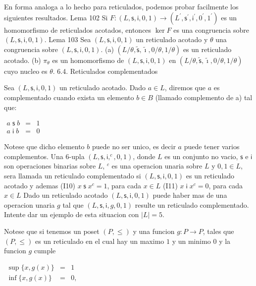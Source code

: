 En forma analoga a lo hecho para reticulados, podemos probar facilmente los siguientes resultados.
Lema 102 Si \(F:(L,\mathsf{s},\mathsf{i},0,1)\rightarrow (L^{\prime },\mathsf{s} ^{\prime },\mathsf{i}^{\prime },0^{\prime },1^{\prime })\) es un homomorfismo de reticulados acotados, entonces \(\ker F\) es una congruencia sobre \((L, \mathsf{s},\mathsf{i},0,1)\).
Lema 103 Sea \((L,\mathsf{s},\mathsf{i},0,1)\) un reticulado acotado y \(\theta \) una congruencia sobre \((L,\mathsf{s},\mathsf{i},0,1)\).
(a) \((L/\theta ,\mathsf{\tilde{s}},\mathsf{\tilde{\imath}},0/\theta ,1/\theta )\) es un reticulado acotado.
(b) \(\pi _{\theta }\) es un homomorfismo de \((L,\mathsf{s},\mathsf{i} ,0,1)\) en \((L/\theta ,\mathsf{\tilde{s}},\mathsf{\tilde{\imath}},0/\theta ,1/\theta )\) cuyo nucleo es \(\theta \).
6.4. Reticulados complementados

Sea \((L,\mathsf{s},\mathsf{i},0,1)\) un reticulado acotado. Dado \( a\in L\), diremos que \(a\) es complementado cuando exista un elemento \(b\in B\) (llamado complemento de a) tal que:

\(\displaystyle \begin{array}{rcl} a\;\mathsf{s\;}b & =& 1 \\ a\;\mathsf{i\;}b & =& 0 \end{array} \)

Notese que dicho elemento \(b\) puede no ser unico, es decir \(a\) puede tener varios complementos. Una \(6\)-upla \((L,\mathsf{s},\mathsf{i},^{c},0,1)\), donde \(L\) es un conjunto no vacio, \(\mathsf{s}\) e \(\mathsf{i}\) son operaciones binarias sobre \(L\), \(^{c}\) es una operacion unaria sobre \(L\) y \( 0,1\in L\), sera llamada un reticulado complementado si \((L,\mathsf{s },\mathsf{i},0,1)\) es un reticulado acotado y ademas
(I10) \(x\mathsf{\;s\;}x^{c}=1\), para cada \(x\in L\)
(I11) \(x\mathsf{\;i\;}x^{c}=0\), para cada \(x\in L\)
Dado un reticulado acotado \((L,\mathsf{s},\mathsf{i},0,1)\) puede haber mas de una operacion unaria \(g\) tal que \((L,\mathsf{s},\mathsf{i} ,g,0,1)\) resulte un reticulado complementado. Intente dar un ejemplo de esta situacion con \(\left\vert L\right\vert =5\).

Notese que si tenemos un poset \((P,\leq )\) y una funcion \(g:P\rightarrow P\), tales que \((P,\leq )\) es un reticulado en el cual hay un maximo \(1\) y un minimo \(0\) y la funcion \(g\) cumple

\(\displaystyle \begin{array}{rcl} \sup \{x,g(x)\} & =& 1 \\ \inf \{x,g(x)\} & =& 0, \end{array} \)

